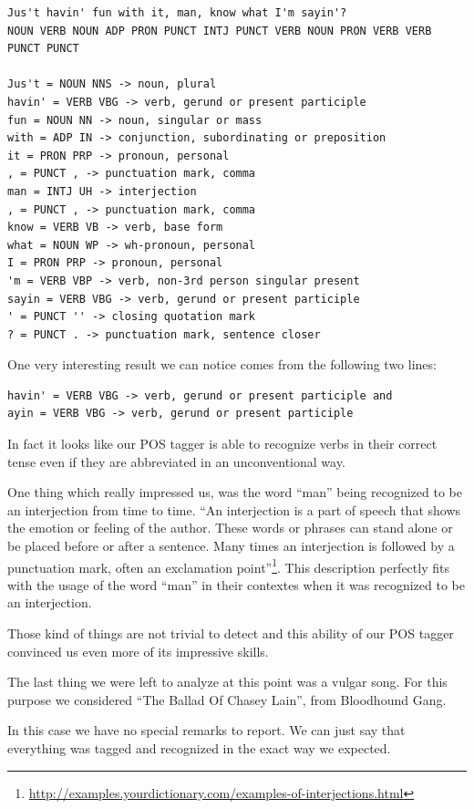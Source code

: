 \begin{lstlisting}
Jus't havin' fun with it, man, know what I'm sayin'?
NOUN VERB NOUN ADP PRON PUNCT INTJ PUNCT VERB NOUN PRON VERB VERB PUNCT PUNCT 

Jus't = NOUN NNS -> noun, plural
havin' = VERB VBG -> verb, gerund or present participle
fun = NOUN NN -> noun, singular or mass
with = ADP IN -> conjunction, subordinating or preposition
it = PRON PRP -> pronoun, personal
, = PUNCT , -> punctuation mark, comma
man = INTJ UH -> interjection
, = PUNCT , -> punctuation mark, comma
know = VERB VB -> verb, base form
what = NOUN WP -> wh-pronoun, personal
I = PRON PRP -> pronoun, personal
'm = VERB VBP -> verb, non-3rd person singular present
sayin = VERB VBG -> verb, gerund or present participle
' = PUNCT '' -> closing quotation mark
? = PUNCT . -> punctuation mark, sentence closer
\end{lstlisting}

One very interesting result we can notice comes from the following two lines:
\begin{lstlisting}
havin' = VERB VBG -> verb, gerund or present participle and
ayin = VERB VBG -> verb, gerund or present participle
\end{lstlisting}

In fact it looks like our POS tagger is able to recognize verbs in their correct tense
even if they are abbreviated in an unconventional way.

One thing which really impressed us, was the word ``man'' being recognized to be an interjection from time to time. 
``An interjection is a part of speech that shows the emotion or feeling of the author. These words or phrases can 
stand alone or be placed before or after a sentence. Many times an interjection is followed 
by a punctuation mark, often an exclamation point''\footnote{\url{http://examples.yourdictionary.com/examples-of-interjections.html}}. 
This description perfectly fits with the usage of the word ``man'' in their contextes when it was recognized to be an interjection. 

Those kind of things are not trivial to detect and this ability of our POS tagger convinced us even more
of its impressive skills.

The last thing we were left to analyze at this point was a vulgar song. For this purpose we considered 
``The Ballad Of Chasey Lain'', from Bloodhound Gang. 

In this case we have no special remarks to report. We can just say that everything was tagged and
recognized in the exact way we expected.


